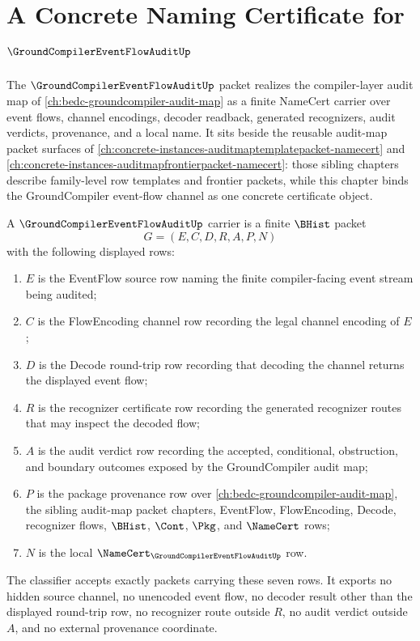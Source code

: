 \chapter{A Concrete Naming Certificate for $\GroundCompilerEventFlowAuditUp$}
\label{ch:concrete-instances-groundcompilereventflowaudit-namecert}

The $\GroundCompilerEventFlowAuditUp$ packet realizes the compiler-layer audit map of \autoref{ch:bedc-groundcompiler-audit-map} as a finite NameCert carrier over event flows, channel encodings, decoder readback, generated recognizers, audit verdicts, provenance, and a local name. It sits beside the reusable audit-map packet surfaces of \autoref{ch:concrete-instances-auditmaptemplatepacket-namecert} and \autoref{ch:concrete-instances-auditmapfrontierpacket-namecert}: those sibling chapters describe family-level row templates and frontier packets, while this chapter binds the GroundCompiler event-flow channel as one concrete certificate object.

\begin{definition}
\label{def:ground-compiler-event-flow-audit-carrier}
A $\GroundCompilerEventFlowAuditUp$ carrier is a finite $\BHist$ packet
$$
G=(E,C,D,R,A,P,N)
$$
with the following displayed rows:
\begin{enumerate}
\item $E$ is the EventFlow source row naming the finite compiler-facing event stream being audited;
\item $C$ is the FlowEncoding channel row recording the legal channel encoding of $E$;
\item $D$ is the Decode round-trip row recording that decoding the channel returns the displayed event flow;
\item $R$ is the recognizer certificate row recording the generated recognizer routes that may inspect the decoded flow;
\item $A$ is the audit verdict row recording the accepted, conditional, obstruction, and boundary outcomes exposed by the GroundCompiler audit map;
\item $P$ is the package provenance row over \autoref{ch:bedc-groundcompiler-audit-map}, the sibling audit-map packet chapters, EventFlow, FlowEncoding, Decode, recognizer flows, $\BHist$, $\Cont$, $\Pkg$, and $\NameCert$ rows;
\item $N$ is the local $\NameCert_{\GroundCompilerEventFlowAuditUp}$ row.
\end{enumerate}
The classifier accepts exactly packets carrying these seven rows. It exports no hidden source channel, no unencoded event flow, no decoder result other than the displayed round-trip row, no recognizer route outside $R$, no audit verdict outside $A$, and no external provenance coordinate.
\end{definition}


